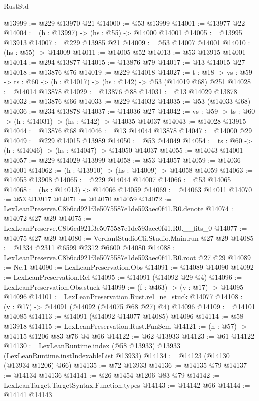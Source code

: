 \begin{lexlean}{RustStd}
\begin{coremodule}
@13999 := @229 @13970 @21
@14000 := @53 @13999
@14001 := @13977 @22
@14004 := (h : @13997) -> (hs : @55) -> @14000 @14001
@14005 := @13995 @13913
@14007 := @229 @13985 @21
@14009 := @53 @14007 @14001
@14010 := (hs : @55) -> @14009
@14011 := @14005 @52
@14013 := @53 @13915 @14001
@14014 := @294 @13877
@14015 := @13876 @79
@14017 := @13 @14015 @27
@14018 := @13876 @76
@14019 := @229 @14018
@14027 := {t : @18} ->
  {vs : @59} -> {ts : @60} -> (h : @14017) -> (hs : @142) -> @53 (@14019 @68) @251
@14028 := @14014 @13878
@14029 := @13876 @88
@14031 := @13 @14029 @13878
@14032 := @13876 @66
@14033 := @229 @14032
@14035 := @53 (@14033 @68)
@14036 := @234 @13878
@14037 := @14036 @27
@14042 := {vs : @59} -> {ts : @60} -> (h : @14031) -> (hs : @142) -> @14035 @14037
@14043 := @14028 @13915
@14044 := @13876 @68
@14046 := @13 @14044 @13878
@14047 := @14000 @29
@14049 := @229 @14015 @13989
@14050 := @53 @14049
@14054 := {ts : @60} -> (h : @14046) -> (hs : @14047) -> @14050 @14037
@14055 := @14043 @14001
@14057 := @229 @14029 @13999
@14058 := @53 @14057
@14059 := @14036 @14001
@14062 := (h : @13910) -> (hs : @14009) -> @14058 @14059
@14063 := @14055 @13908
@14065 := @229 @14044 @14007
@14066 := @53 @14065
@14068 := (hs : @14013) -> @14066 @14059
@14069 := @14063 @14011
@14070 := @53 @13917
@14071 := @14070 @14059
@14072 := LexLeanPreserve.C8b6cd921f3e5075587e1de593aec0f41.R0.denote
@14074 := @14072 @27 @29
@14075 := LexLeanPreserve.C8b6cd921f3e5075587e1de593aec0f41.R0.__fits_0
@14077 := @14075 @27 @29
@14080 := VerdantStudioCli.Studio.Main.run @27 @29
@14085 := @1334 @2311 @6599 @2312 @6600 @14080
@14088 := LexLeanPreserve.C8b6cd921f3e5075587e1de593aec0f41.R0.root @27 @29
@14089 := Ne.{1}
@14090 := LexLeanPreservation.Obs
@14091 := @14089 @14090
@14092 := LexLeanPreservation.Rel
@14095 := @14091 (@14092 @29 @4)
@14096 := LexLeanPreservation.Obs.stuck
@14099 := (f : @463) -> (v : @17) -> @14095 @14096
@14101 := LexLeanPreservation.Rust.rel_ne_stuck @14077
@14108 := (v : @17) -> @14091 (@14092 (@14075 @68 @27) @4) @14096
@14109 := @14101 @14085
@14113 := @14091 (@14092 @14077 @14085) @14096
@14114 := @58 @13918
@14115 := LexLeanPreservation.Rust.FunSem
@14121 := (n : @57) -> @14115 @1206 @83 @76 @4 @66
@14122 := @62 @13933
@14123 := @61 @14122
@14130 := LexLeanRuntime.index (@58 @13933) @13933 (LexLeanRuntime.instIndexableList @13933)
@14134 := @14123 (@14130 (@13934 @1206) @66)
@14135 := @72 @13933
@14136 := @14135 @79
@14137 := @14134 @14136
@14141 := @26 @1454 @1206 @83 @79
@14142 := LexLeanTarget.TargetSyntax.Function.types
@14143 := @14142 @66
@14144 := @14141 @14143

\end{coremodule}
\end{lexlean}
